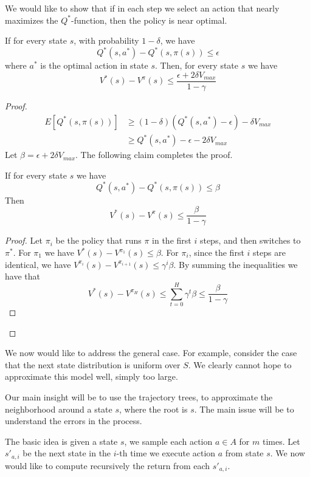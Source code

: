 We would like to show that if in each step we select an action that
nearly maximizes the $Q^*$-function, then the policy is near
optimal.

\begin{lemma}
If for every state $s$, with probability $1-\delta$, we have
\[
Q^*(s,a^*)-Q^*(s,\pi(s))\leq \epsilon
\]
where $a^*$ is the optimal action in state $s$. Then, for every
state $s$ we have
\[
V^*(s)-V^\pi(s)\leq \frac{\epsilon+2\delta V_{max}}{1-\gamma}
\]
\end{lemma}

\begin{proof}
\begin{align*}
E[Q^*(s,\pi(s))] &\geq (1-\delta)(Q^*(s,a^*)-\epsilon)-\delta
V_{max}\\
&\geq Q^*(s,a^*)-\epsilon -2\delta V_{max}
\end{align*}
Let $\beta=\epsilon+2\delta V_{max}$. The following claim completes
the proof.
\begin{claim}
If for every state $s$ we have
\[
Q^*(s,a^*)-Q^*(s,\pi(s))\leq \beta
\]
Then
\[
V^*(s)-V^\pi(s)\leq \frac{\beta}{1-\gamma}
\]
\end{claim}

\begin{proof}
Let $\pi_i$ be the policy that runs $\pi$ in the first $i$ steps,
and then switches to $\pi^*$. For $\pi_1$ we have
$V^*(s)-V^{\pi_1}(s)\leq \beta$. For $\pi_i$, since the first $i$
steps are identical, we have $V^{\pi_i}(s)-V^{\pi_{i+1}}(s)\leq
\gamma^i\beta$. By summing the inequalities we have that
\[
V^*(s)-V^{\pi_H}(s)\leq \sum_{t=0}^H
\gamma^t \beta\leq \frac{\beta}{1-\gamma}
\]
\end{proof}
\end{proof}

We now would like to address the general case. For example, consider
the case that the next state distribution is uniform over $S$. We
clearly cannot hope to approximate this model well, simply too
large.

Our main insight will be to use the trajectory trees, to approximate
the neighborhood around a state $s$, where the root is $s$. The main
issue will be to understand the errors in the process.

The basic idea is given a state $s$, we sample each action $a\in A$
for $m$ times. Let $s'_{a,i}$ be the next state in the $i$-th time
we execute action $a$ from state $s$. We now would like to compute
recursively the return from each $s'_{a,i}$.


